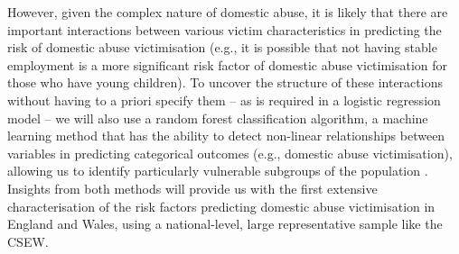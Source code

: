 \documentclass[11pt, a4paper]{article}
\newcommand{\TM}[1] {{\textcolor{orange}{#1}}}
\begin{document}
However, given the complex nature of domestic abuse, it is likely that there are important interactions between various victim characteristics in predicting the risk of domestic abuse victimisation (e.g., it is possible that not having stable employment is a more significant risk factor of domestic abuse victimisation for those who have young children). To uncover the structure of these interactions without having to a priori specify them -- as is required in a logistic regression model -- we will also use a random forest classification algorithm, a machine learning method that has the ability to detect non-linear relationships between variables in predicting categorical outcomes (e.g., domestic abuse victimisation), allowing us to identify particularly vulnerable subgroups of the population \cite{rforest}. Insights from both methods will provide us with the first extensive characterisation of the risk factors predicting domestic abuse victimisation in England and Wales, using a national-level, large representative sample like the CSEW.






\end{document}
